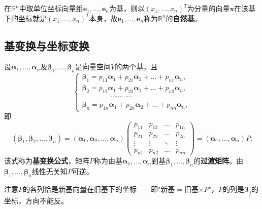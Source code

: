 在$\mathbb{R}^{n}$中取单位坐标向量组$\boldsymbol{e}_1,\dots,\boldsymbol{e}_n$为基，则以$(x_1,\dots,x_n)^{T}$为分量的向量$\boldsymbol{x}$在该基下的坐标就是$(x_1,\dots,x_n)^{T}$本身，故$\boldsymbol{e}_1,\dots,\boldsymbol{e}_n$称为$\mathbb{R}^{n}$的\textbf{自然基}。

\subsection{基变换与坐标变换}
\begin{definition}[基变换公式与过渡矩阵]
设$\boldsymbol{\alpha}_1,\dots,\boldsymbol{\alpha}_n$及$\boldsymbol{\beta}_1,\dots,\boldsymbol{\beta}_n$是向量空间$V$的两个基，且
\[
\begin{cases}
\boldsymbol{\beta}_1=p_{11}\boldsymbol{\alpha}_1+p_{21}\boldsymbol{\alpha}_2+\dots+p_{n1}\boldsymbol{\alpha}_n,\\
\boldsymbol{\beta}_2=p_{12}\boldsymbol{\alpha}_1+p_{22}\boldsymbol{\alpha}_2+\dots+p_{n2}\boldsymbol{\alpha}_n,\\
\qquad\qquad\cdots\cdots\cdots\cdots\\
\boldsymbol{\beta}_n=p_{1n}\boldsymbol{\alpha}_1+p_{2n}\boldsymbol{\alpha}_2+\dots+p_{nn}\boldsymbol{\alpha}_n,
\end{cases}
\]
即
\[
(\boldsymbol{\beta}_1,\boldsymbol{\beta}_2,\dots,\boldsymbol{\beta}_n)
=(\boldsymbol{\alpha}_1,\boldsymbol{\alpha}_2,\dots,\boldsymbol{\alpha}_n)
\begin{pmatrix}
p_{11}&p_{12}&\dots&p_{1n}\\
p_{21}&p_{22}&\dots&p_{2n}\\
\vdots&\vdots&\ddots&\vdots\\
p_{n1}&p_{n2}&\dots&p_{nn}
\end{pmatrix}
=(\boldsymbol{\alpha}_1,\dots,\boldsymbol{\alpha}_n)P .
\]
该式称为\textbf{基变换公式}，矩阵$P$称为由基$\boldsymbol{\alpha}_1,\dots,\boldsymbol{\alpha}_n$到基$\boldsymbol{\beta}_1,\dots,\boldsymbol{\beta}_n$的\textbf{过渡矩阵}。由$\boldsymbol{\beta}_1,\dots,\boldsymbol{\beta}_n$线性无关知$P$可逆。
\end{definition}

注意$P$的各列恰是新基向量在旧基下的坐标——即"新基$=$旧基$\times P$"，$P$的列是$\boldsymbol{\beta}_j$的坐标，方向不能反。

